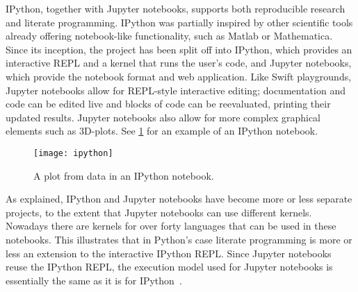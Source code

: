 IPython, together with Jupyter notebooks,
supports both reproducible research and literate programming. IPython was
partially inspired by other scientific tools already offering notebook-like
functionality, such as Matlab or Mathematica. Since its inception, the project
has been split off into IPython, which provides an interactive REPL and a
kernel that runs the user's code, and Jupyter notebooks, which provide the
notebook format and web application. Like Swift playgrounds, Jupyter notebooks
allow for REPL-style interactive editing; documentation and code can be edited
live and blocks of code can be reevaluated, printing their updated results.
Jupyter notebooks also allow for more complex graphical elements such as
3D-plots. See \cref{fig:ipython} for an example of an IPython notebook.

\begin{figure}[htb]
  \centering
  \texttt{[image: ipython]}
  \caption{A plot from data in an IPython notebook.}
  \label{fig:ipython}
\end{figure}

As explained, IPython and Jupyter notebooks have become more or less separate
projects, to the extent that Jupyter notebooks can use different kernels.
Nowadays there are kernels for over forty languages that can be used in these
notebooks. This illustrates that in Python's case literate programming is more
or less an extension to the interactive IPython REPL. Since Jupyter notebooks
reuse the IPython REPL, the execution model used for Jupyter notebooks is
essentially the same as it is for IPython~\cite{ipython-execution}.


